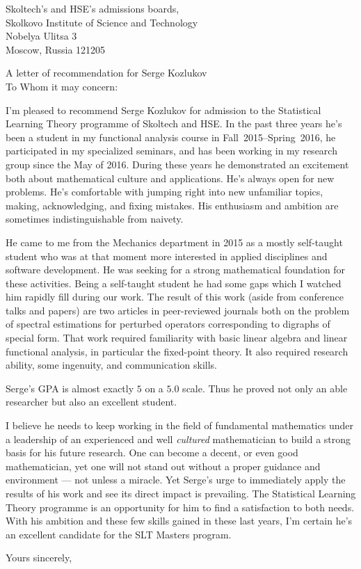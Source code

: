 \documentclass{letter}
\begin{document}
\begin{letter}{Skoltech's and HSE's admissions boards,\\
Skolkovo Institute of Science and Technology\\
Nobelya Ulitsa 3\\
Moscow, Russia 121205
}
\opening{A letter of recommendation for Serge Kozlukov\\[1cm]
  To Whom it may concern:}
I'm pleased to recommend Serge Kozlukov for admission to the Statistical
Learning Theory programme of Skoltech and HSE. In the past three years
he's been a student in my functional analysis course in Fall~2015--Spring~2016,
he participated in my specialized seminars,
and has been working in my research group since the May of 2016.
During these years he demonstrated an excitement both about mathematical culture
and applications. He's always open for new problems. He's comfortable with
jumping right into new unfamiliar topics, making, acknowledging, and
fixing mistakes. His enthusiasm and ambition are sometimes indistinguishable from
naivety.

He came to me from the Mechanics department in 2015 as a mostly self-taught student
who was at that moment more interested in applied disciplines and software
development. He was seeking for a strong mathematical foundation for these
activities. Being a self-taught student he had some gaps which I watched him
rapidly fill during our work. The result of this work (aside from conference
talks and papers) are two articles in peer-reviewed journals both on the problem
of spectral estimations for perturbed operators corresponding to digraphs of
special form. That work required familiarity with basic linear algebra and
linear functional analysis, in particular the fixed-point theory. It also
required research ability, some ingenuity, and communication skills.

Serge's GPA is almost exactly $5$ on a $5.0$ scale. Thus he proved not only an
able researcher but also an excellent student.

I believe he needs to keep working in the field of fundamental mathematics under
a leadership of an experienced and well \emph{cultured} mathematician to build a
strong basis for his future research. One can become a decent, or even good
mathematician, yet one will not stand out without a proper guidance and
environment --- not unless a miracle. Yet Serge's urge to immediately apply the
results of his work and see its direct impact is prevailing. The Statistical
Learning Theory programme is an opportunity for him to find a satisfaction to
both needs. With his ambition and these few skills gained in these last years,
I'm certain he's an excellent candidate for the SLT Masters program.

\closing{Yours sincerely,}
\end{letter}
\end{document}

